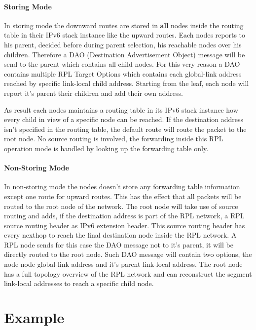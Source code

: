 \documentclass[letterpaper]{article}
\begin{document}
\paragraph{Storing Mode}

In storing mode the downward routes are stored in {\bf all} nodes inside the routing table in their IPv6 stack instance like the upward routes.
Each nodes reports to his parent, decided before during parent selection, his reachable nodes over his children.
Therefore a DAO (Destination Advertisement Object) message will be send to the parent which contains all child nodes.
For this very reason a DAO contains multiple RPL Target Options which contains each global-link address reached by specific link-local child address.
Starting from the leaf, each node will report it's parent their children and add their own address.

As result each nodes maintains a routing table in its IPv6 stack instance how every child in view of a specific node can be reached.
If the destination address isn't specified in the routing table, the default route will route the packet to the root node.
No source routing is involved, the forwarding inside this RPL operation mode is handled by looking up the forwarding table only.

\paragraph{Non-Storing Mode}

In non-storing mode the nodes doesn't store any forwarding table information except one route for upward routes.
This has the effect that all packets will be routed to the root node of the network.
The root node will take use of source routing and adds, if the destination address is part of the RPL network, a RPL source routing header as IPv6 extension header.
This source routing header has every nexthop to reach the final destination node inside the RPL network.
A RPL node sends for this case the DAO message not to it's parent, it will be directly routed to the root node.
Such DAO message will contain two options, the node node global-link address and it's parent link-local address.
The root node has a full topology overview of the RPL network and can reconstruct the segment link-local addresses to reach a specific child node.

\section{Example}
\end{document}
